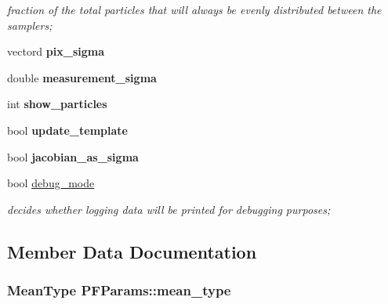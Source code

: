 \begin{DoxyCompactItemize}
\begin{DoxyCompactList}\small\item\em fraction of the total particles that will always be evenly distributed between the samplers; \end{DoxyCompactList}\item 
\hypertarget{structPFParams_ae82e66e3eb7cda1523dc3b50fb962653}{vectord {\bfseries pix\-\_\-sigma}}\label{structPFParams_ae82e66e3eb7cda1523dc3b50fb962653}

\item 
\hypertarget{structPFParams_a04c8578340d1a5458d631537f42e7703}{double {\bfseries measurement\-\_\-sigma}}\label{structPFParams_a04c8578340d1a5458d631537f42e7703}

\item 
\hypertarget{structPFParams_a196176cd686a89b6f685df39eb775990}{int {\bfseries show\-\_\-particles}}\label{structPFParams_a196176cd686a89b6f685df39eb775990}

\item 
\hypertarget{structPFParams_a72053f753c91584640ed00f9c519448a}{bool {\bfseries update\-\_\-template}}\label{structPFParams_a72053f753c91584640ed00f9c519448a}

\item 
\hypertarget{structPFParams_a7718a682411789a8ca70f6065131ec3e}{bool {\bfseries jacobian\-\_\-as\-\_\-sigma}}\label{structPFParams_a7718a682411789a8ca70f6065131ec3e}

\item 
\hypertarget{structPFParams_ad7c0d7ff3b81ee2d0261898a762e917c}{bool \hyperlink{structPFParams_ad7c0d7ff3b81ee2d0261898a762e917c}{debug\-\_\-mode}}\label{structPFParams_ad7c0d7ff3b81ee2d0261898a762e917c}

\begin{DoxyCompactList}\small\item\em decides whether logging data will be printed for debugging purposes; \end{DoxyCompactList}\end{DoxyCompactItemize}


\subsection{Member Data Documentation}
\hypertarget{structPFParams_adef741dc9861c4a22ee8543d0b383221}{
\subsubsection[{mean\-\_\-type}]{\setlength{\rightskip}{0pt plus 5cm}Mean\-Type P\-F\-Params\-::mean\-\_\-type}}\label{structPFParams_adef741dc9861c4a22ee8543d0b383221}


